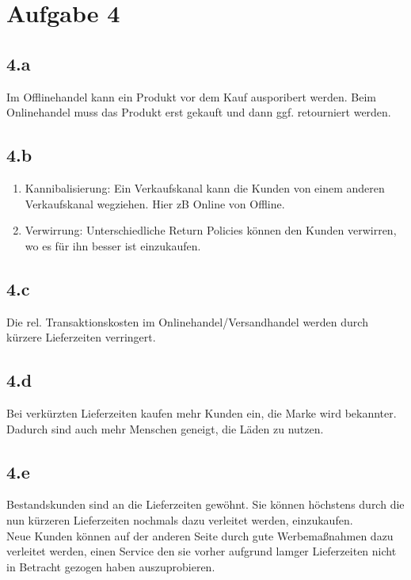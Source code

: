 \section{Aufgabe 4}
\subsection{4.a}
    Im Offlinehandel kann ein Produkt vor dem Kauf ausporibert werden. Beim Onlinehandel muss das Produkt erst gekauft und dann ggf. retourniert werden.
    
\subsection{4.b}
    \begin{enumerate}
        \item Kannibalisierung: Ein Verkaufskanal kann die Kunden von einem anderen Verkaufskanal wegziehen. Hier zB Online von Offline.
        \item Verwirrung: Unterschiedliche Return Policies können den Kunden verwirren, wo es für ihn besser ist einzukaufen.
    \end{enumerate}

\subsection{4.c}
    Die rel. Transaktionskosten im Onlinehandel/Versandhandel werden durch kürzere Lieferzeiten verringert.

\subsection{4.d}
    Bei verkürzten Lieferzeiten kaufen mehr Kunden ein, die Marke wird bekannter. Dadurch sind auch mehr Menschen geneigt, die Läden zu nutzen.

\subsection{4.e}
    Bestandskunden sind an die Lieferzeiten gewöhnt. Sie können höchstens durch die nun kürzeren Lieferzeiten nochmals dazu verleitet werden, einzukaufen. \\
    Neue Kunden können auf der anderen Seite durch gute Werbemaßnahmen dazu verleitet werden, einen Service den sie vorher aufgrund lamger Lieferzeiten nicht in Betracht gezogen haben auszuprobieren. \\